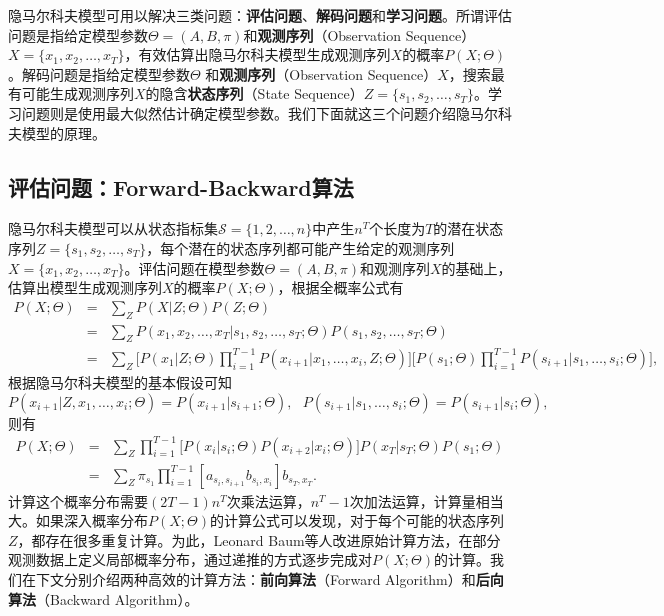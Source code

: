 隐马尔科夫模型可用以解决三类问题：\textbf{评估问题}、\textbf{解码问题}和\textbf{学习问题}。所谓评估问题是指给定模型参数$\Theta=(A,B,\pi)$和\textbf{观测序列}（Observation Sequence）$X=\{x_1,x_2,\ldots,x_T\}$，有效估算出隐马尔科夫模型生成观测序列$X$的概率$P(X;\Theta)$。解码问题是指给定模型参数$\Theta$ 和\textbf{观测序列}（Observation Sequence）$X$，搜索最有可能生成观测序列$X$的隐含\textbf{状态序列}（State Sequence）$Z=\{s_1,s_2,\ldots,s_T\}$。学习问题则是使用最大似然估计确定模型参数。我们下面就这三个问题介绍隐马尔科夫模型的原理。

\subsection{评估问题：Forward-Backward算法}
隐马尔科夫模型可以从状态指标集$\mathcal S=\{1,2,\ldots,n\}$中产生$n^T$个长度为$T$的潜在状态序列$Z=\{s_1,s_2,\ldots,s_T\}$，每个潜在的状态序列都可能产生给定的观测序列$X=\{x_1,x_2,\ldots,x_T\}$。评估问题在模型参数$\Theta=(A,B,\pi)$和观测序列$X$的基础上，估算出模型生成观测序列$X$的概率$P(X;\Theta)$，根据全概率公式有
\[
\begin{array}{lcl}
    P(X;\Theta) &=& \sum\limits_Z P(X|Z;\Theta) P(Z;\Theta) \\
    &=& \sum\limits_Z P(x_1,x_2,\ldots,x_T|s_1,s_2,\ldots,s_T;\Theta) P(s_1,s_2,\ldots,s_T;\Theta)\\
    &=& \sum\limits_Z \big[P(x_1|Z;\Theta) \prod\limits_{i=1}^{T-1} P(x_{i+1}|x_1,\ldots,x_i,Z;\Theta)\big] \big[P(s_1;\Theta) \prod\limits_{i=1}^{T-1} P(s_{i+1}|s_1,\ldots,s_i;\Theta)\big],
\end{array}
\]
根据隐马尔科夫模型的基本假设可知
\[
    P(x_{i+1}|Z, x_1,\ldots,x_i;\Theta) = P(x_{i+1}|s_{i+1};\Theta),~~~P(s_{i+1}|s_1,\ldots,s_i;\Theta) = P(s_{i+1}|s_i;\Theta),
\]
则有
\[
\begin{array}{lcl}
    P(X;\Theta) &=& \sum\limits_Z \prod\limits_{i=1}^{T-1} \big[P(x_i|s_i;\Theta)P(x_{i+2}|x_i;\Theta)\big] P(x_T|s_T;\Theta) P(s_1;\Theta)\\
    &=&\sum\limits_Z \pi_{s_1} \prod\limits_{i=1}^{T-1} [a_{s_i,s_{i+1}} b_{s_i,x_i}]b_{s_T,x_T}.
\end{array}
\]
计算这个概率分布需要$(2T-1)n^T$次乘法运算，$n^T-1$次加法运算，计算量相当大。如果深入概率分布$P(X;\Theta)$的计算公式可以发现，对于每个可能的状态序列$Z$，都存在很多重复计算。为此，Leonard Baum等人改进原始计算方法，在部分观测数据上定义局部概率分布，通过递推的方式逐步完成对$P(X;\Theta)$的计算。我们在下文分别介绍两种高效的计算方法：\textbf{前向算法}（Forward Algorithm）和\textbf{后向算法}（Backward Algorithm）。

